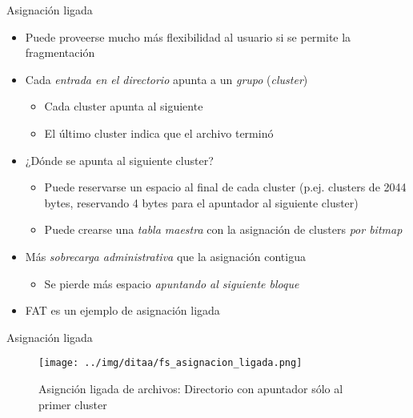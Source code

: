 \documentclass[presentation]{beamer}
\begin{document}
\begin{frame}[label={sec:org301cae4}]{Asignación ligada}
\begin{itemize}
\item Puede proveerse mucho más flexibilidad al usuario si se permite la
fragmentación
\item Cada \emph{entrada en el directorio} apunta a un \emph{grupo} (\emph{cluster})
\begin{itemize}
\item Cada cluster apunta al siguiente
\item El último cluster indica que el archivo terminó
\end{itemize}
\item ¿Dónde se apunta al siguiente cluster?
\begin{itemize}
\item Puede reservarse un espacio al final de cada cluster
(p.ej. clusters de 2044 bytes, reservando 4 bytes para el
apuntador al siguiente cluster)
\item Puede crearse una \emph{tabla maestra} con la asignación de clusters
\emph{por bitmap}
\end{itemize}
\item Más \emph{sobrecarga administrativa} que la asignación contigua
\begin{itemize}
\item Se pierde más espacio \emph{apuntando al siguiente bloque}
\end{itemize}
\item FAT es un ejemplo de asignación ligada
\end{itemize}
\end{frame}

\begin{frame}[label={sec:org43b5c7f}]{Asignación ligada}
\begin{figure}[htbp]
\centering
\texttt{[image: ../img/ditaa/fs\_asignacion\_ligada.png]}
\caption{Asignción ligada de archivos: Directorio con apuntador sólo al primer cluster}
\end{figure}
\end{frame}
\end{document}
